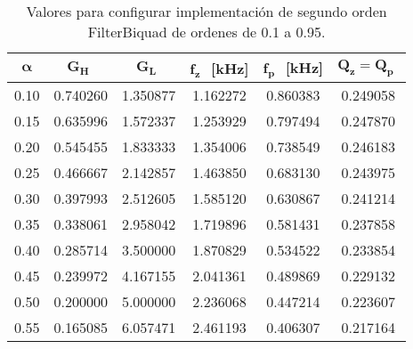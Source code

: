 	\begin{table}[!hbp]                                      
		\centering   
		\caption{Valores para configurar implementación de segundo orden FilterBiquad de ordenes de 0.1 a 0.95.}                            
		\label{tab:calculos_biquad}                                        
			\begin{tabular}{cccccc}                        
			\hline                                              
			$\bm{\alpha}$ & $\bm{G_{H}}\,\,$  & $\bm{G_{L}}\,\,$  & $\bm{f_{z}}\,\,$ [kHz] & $\bm{f_{p}}\,\,$ [kHz] & $\bm{Q_{z} = Q_{p}}\,\,$  \\            
			\hline                                              
			0.10 & 0.740260 & 1.350877 & 1.162272 & 0.860383 & 0.249058 \\   
		                                                          
			0.15 & 0.635996 & 1.572337 & 1.253929 & 0.797494 & 0.247870 \\   
		                                                        
			0.20 & 0.545455 & 1.833333 & 1.354006 & 0.738549 & 0.246183 \\   
	                                                          
			0.25 & 0.466667 & 2.142857 & 1.463850 & 0.683130 & 0.243975 \\   
		                                                        
			0.30 & 0.397993 & 2.512605 & 1.585120 & 0.630867 & 0.241214 \\   
		                                                          
			0.35 & 0.338061 & 2.958042 & 1.719896 & 0.581431 & 0.237858 \\   
			                                                        
			0.40 & 0.285714 & 3.500000 & 1.870829 & 0.534522 & 0.233854 \\   
		                                                          
			0.45 & 0.239972 & 4.167155 & 2.041361 & 0.489869 & 0.229132 \\   
			                                                          
			0.50 & 0.200000 & 5.000000 & 2.236068 & 0.447214 & 0.223607 \\   
		                                                         
			0.55 & 0.165085 & 6.057471 & 2.461193 & 0.406307 & 0.217164 \\   
			                                                         

\end{tabular}
\end{table}
